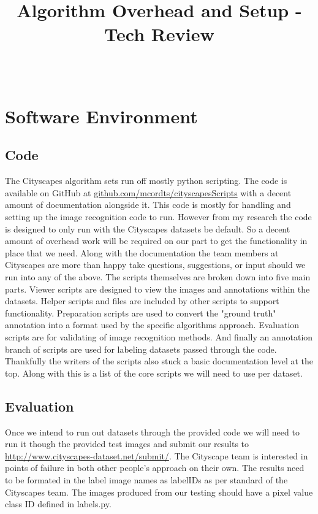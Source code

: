 \documentclass[10pt,draftclsnofoot,onecolumn,journal,compsoc]{IEEEtran}
\title{Algorithm Overhead and Setup - Tech Review}
\author{
  \IEEEauthorblockN{Team (Group 32) name: Teaching AutoPilot to Dodge\\ Tanner Fry} \\
  \IEEEauthorblockA{CS 461: Senior Capstone Fall 2016 \\ Oregon State University}
}
\date{}
\begin{document}
\maketitle
\IEEEdisplaynontitleabstractindextext
\IEEEpeerreviewmaketitle

\newpage

\tableofcontents

\newpage

\section{Software Environment}
    \subsection{Code}
	The Cityscapes algorithm sets run off mostly python scripting. The code is available on GitHub at \url{github.com/mcordts/cityscapesScripts} with a decent amount of documentation alongside it. This code is mostly for handling and setting up the image recognition code to run. However from my research the code is designed to only run with the Cityscapes datasets be default. So a decent amount of overhead work will be required on our part to get the functionality in place that we need. Along with the documentation the team members at Cityscapes are more than happy take questions, suggestions, or input should we run into any of the above.
    The scripts themselves are broken down into five main parts. Viewer scripts are designed to view the images and annotations within the datasets. Helper scripts and files are included by other scripts to support functionality. Preparation scripts are used to convert the "ground truth" annotation into a format used by the specific algorithms approach. Evaluation scripts are for validating of image recognition methods. And finally an annotation branch of scripts are used for labeling datasets passed through the code.
    Thankfully the writers of the scripts also stuck a basic documentation level at the top. Along with this is a list of the core scripts we will need to use per dataset.
    \subsection{Evaluation}
    Once we intend to run out datasets through the provided code we will need to run it though the provided test images and submit our results to \url{http://www.cityscapes-dataset.net/submit/}. The Cityscape team is interested in points of failure in both other people's approach on their own. The results need to be formated in the label image names as labelIDs as per standard of the Cityscapes team. The images produced from our testing should have a pixel value class ID defined in labels.py. 
\end{document}
